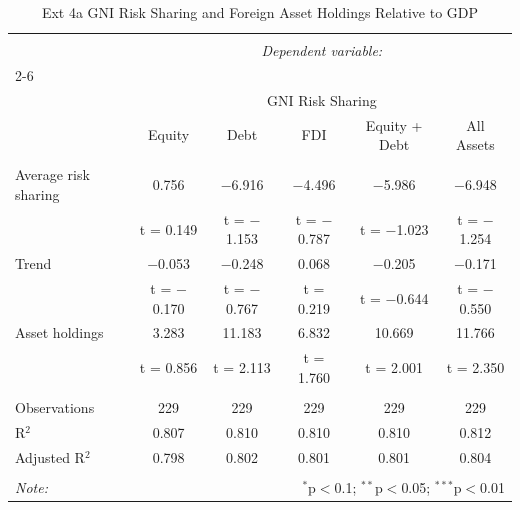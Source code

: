 
\begin{table}[!htbp] \centering 
  \caption{Ext 4a GNI Risk Sharing and Foreign Asset Holdings Relative to GDP} 
  \label{} 
\begin{tabular}{@{\extracolsep{5pt}}lccccc} 
\\[-1.8ex]\hline 
\hline \\[-1.8ex] 
 & \multicolumn{5}{c}{\textit{Dependent variable:}} \\ 
\cline{2-6} 
\\[-1.8ex] & \multicolumn{5}{c}{GNI Risk Sharing} \\ 
 & Equity & Debt & FDI & Equity + Debt & All Assets \\ 
\hline \\[-1.8ex] 
 Average risk sharing & 0.756 & $-$6.916 & $-$4.496 & $-$5.986 & $-$6.948 \\ 
  & t = 0.149 & t = $-$1.153 & t = $-$0.787 & t = $-$1.023 & t = $-$1.254 \\ 
  Trend & $-$0.053 & $-$0.248 & 0.068 & $-$0.205 & $-$0.171 \\ 
  & t = $-$0.170 & t = $-$0.767 & t = 0.219 & t = $-$0.644 & t = $-$0.550 \\ 
  Asset holdings & 3.283 & 11.183 & 6.832 & 10.669 & 11.766 \\ 
  & t = 0.856 & t = 2.113 & t = 1.760 & t = 2.001 & t = 2.350 \\ 
 \hline \\[-1.8ex] 
Observations & 229 & 229 & 229 & 229 & 229 \\ 
R$^{2}$ & 0.807 & 0.810 & 0.810 & 0.810 & 0.812 \\ 
Adjusted R$^{2}$ & 0.798 & 0.802 & 0.801 & 0.801 & 0.804 \\ 
\hline 
\hline \\[-1.8ex] 
\textit{Note:}  & \multicolumn{5}{r}{$^{*}$p$<$0.1; $^{**}$p$<$0.05; $^{***}$p$<$0.01} \\ 
\end{tabular} 
\end{table} 
